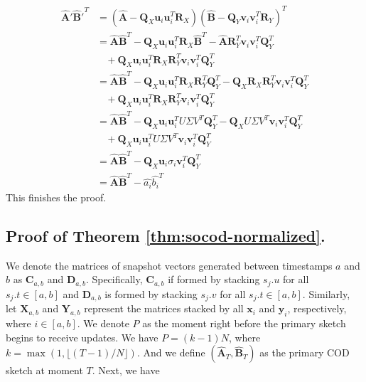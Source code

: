 \begin{align}
    \hat{\boldsymbol{A}}{'}{\hat{\boldsymbol{B}}{'}}^T & = (\hat{\boldsymbol{A}} - \boldsymbol{Q}_X\boldsymbol{u}_i\boldsymbol{u}_i^T\boldsymbol{R}_X)(\hat{\boldsymbol{B}} - \boldsymbol{Q}_Y\boldsymbol{v}_i\boldsymbol{v}_i^T\boldsymbol{R}_Y)^T \nonumber \\ 
    & = \hat{\boldsymbol{A}}\hat{\boldsymbol{B}}^T - \boldsymbol{Q}_X\boldsymbol{u}_i\boldsymbol{u}_i^T\boldsymbol{R}_X\hat{\boldsymbol{B}}^T - \hat{\boldsymbol{A}}\boldsymbol{R}_Y^T\boldsymbol{v}_i\boldsymbol{v}_i^T\boldsymbol{Q}_Y^T \nonumber \\
    &\ \ \ \ + \boldsymbol{Q}_X\boldsymbol{u}_i\boldsymbol{u}_i^T\boldsymbol{R}_X\boldsymbol{R}_Y^T\boldsymbol{v}_i\boldsymbol{v}_i^T\boldsymbol{Q}_Y^T \nonumber \\
    & = \hat{\boldsymbol{A}}\hat{\boldsymbol{B}}^T - \boldsymbol{Q}_X\boldsymbol{u}_i\boldsymbol{u}_i^T\boldsymbol{R}_X\boldsymbol{R}_Y^T\boldsymbol{Q}_Y^T - \boldsymbol{Q}_X \boldsymbol{R}_X
    \boldsymbol{R}_Y^T\boldsymbol{v}_i\boldsymbol{v}_i^T\boldsymbol{Q}_Y^T \nonumber \\
    &\ \ \ \ + \boldsymbol{Q}_X\boldsymbol{u}_i\boldsymbol{u}_i^T\boldsymbol{R}_X\boldsymbol{R}_Y^T\boldsymbol{v}_i\boldsymbol{v}_i^T\boldsymbol{Q}_Y^T \nonumber \\
    & = \hat{\boldsymbol{A}}\hat{\boldsymbol{B}}^T - \boldsymbol{Q}_X\boldsymbol{u}_i\boldsymbol{u}_i^TU\Sigma V^T\boldsymbol{Q}_Y^T - \boldsymbol{Q}_XU\Sigma V^T\boldsymbol{v}_i\boldsymbol{v}_i^T\boldsymbol{Q}_Y^T \nonumber \\
    &\ \ \ \ + \boldsymbol{Q}_X\boldsymbol{u}_i\boldsymbol{u}_i^TU\Sigma V^T\boldsymbol{v}_i\boldsymbol{v}_i^T\boldsymbol{Q}_Y^T \nonumber \\
    & = \hat{\boldsymbol{A}}\hat{\boldsymbol{B}}^T - \boldsymbol{Q}_X\boldsymbol{u}_i\sigma_i\boldsymbol{v}_i^T\boldsymbol{Q}_Y^T \nonumber \\
    & = \hat{\boldsymbol{A}}\hat{\boldsymbol{B}}^T - \hat{a_i}\hat{b_i}^T \nonumber
\end{align}
This finishes the proof. 

\subsection{Proof of Theorem \ref{thm:socod-normalized}.}

We denote the matrices of snapshot vectors generated between timestamps $a$ and $b$ as $\boldsymbol{C}_{a,b}$ and $\boldsymbol{D}_{a,b}$. Specifically, $\boldsymbol{C}_{a,b}$ if formed by stacking $s_j.u$ for all $s_j.t\in [a,b]$ and $\boldsymbol{D}_{a,b}$ is formed by stacking $s_j.v$ for all $s_j.t\in [a,b]$. Similarly, let $\boldsymbol{X}_{a,b}$ and $\boldsymbol{Y}_{a,b}$ represent the matrices stacked by all $\boldsymbol{x}_i$ and $\boldsymbol{y}_i$, respectively, where $i\in[a,b]$. We denote $P$ as the moment right before the primary sketch begins to receive updates. We have $P = (k-1)N$, where $k = \max(1,\lfloor (T-1)/N\rfloor)$. And we define $(\hat{\boldsymbol{A}}_T,\hat{\boldsymbol{B}}_T)$ as the primary COD sketch at moment $T$. Next, we have

